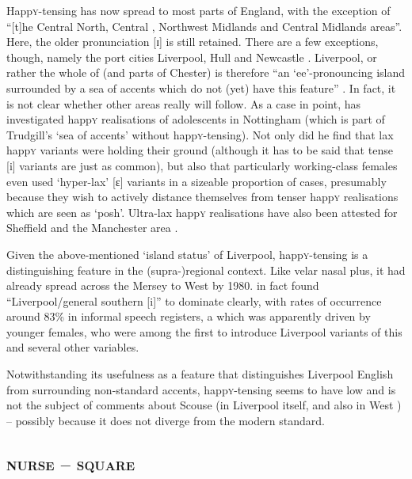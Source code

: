 Happ\textsc{y}-tensing has now spread to most parts of England, with the exception of ``[t]he Central North, Central , Northwest Midlands and Central Midlands areas''.
Here, the older pronunciation [ɪ] is still retained.
There are a few exceptions, though, namely the port cities Liverpool, Hull and Newcastle \citep[cf.][62]{trudgill1999}.
Liverpool, or rather the whole of  (and parts of Chester) is therefore ``an `ee'-pronouncing island surrounded by a sea of accents which do not (yet) have this feature'' \citep[72]{trudgill1999}.
In fact, it is not clear whether other areas really will follow.
As a case in point, \textcite{flynn2010} has investigated happ\textsc{y} realisations of adolescents in Nottingham (which is part of Trudgill's `sea of accents' without happ\textsc{y}-tensing).
Not only did he find that lax happ\textsc{y} variants were holding their ground (although it has to be said that tense [i] variants are just as common), but also that particularly working-class females even used `hyper-lax' [ɛ] variants in a sizeable proportion of cases, presumably because they wish to actively distance themselves from tenser happ\textsc{y} realisations which are seen as `posh'.
Ultra-lax happ\textsc{y} realisations have also been attested for Sheffield \parencite{stoddartetal1999} and the Manchester area \parencite{watts2006}.

Given the above-mentioned `island status' of Liverpool, happ\textsc{y}-tensing is a distinguishing feature in the (supra-)regional context.
Like velar nasal plus, it had already spread across the Mersey to West  by 1980.
\textcite[97 and 99]{newbrook1999} in fact found ``Liverpool/general southern [i]'' to dominate clearly, with rates of occurrence around 83\% in informal speech registers, a  which was apparently driven by younger females, who were among the first to introduce Liverpool variants of this and several other variables.

Notwithstanding its usefulness as a feature that distinguishes Liverpool English from surrounding non-standard accents, happ\textsc{y}-tensing seems to have low  and is not the subject of comments about Scouse (in Liverpool itself, and also in West ) -- possibly because it does not diverge from the modern standard.

		\subsection{\textsc{nurse} -- \textsc{square}}\label{sec.var.vow.nurse}

